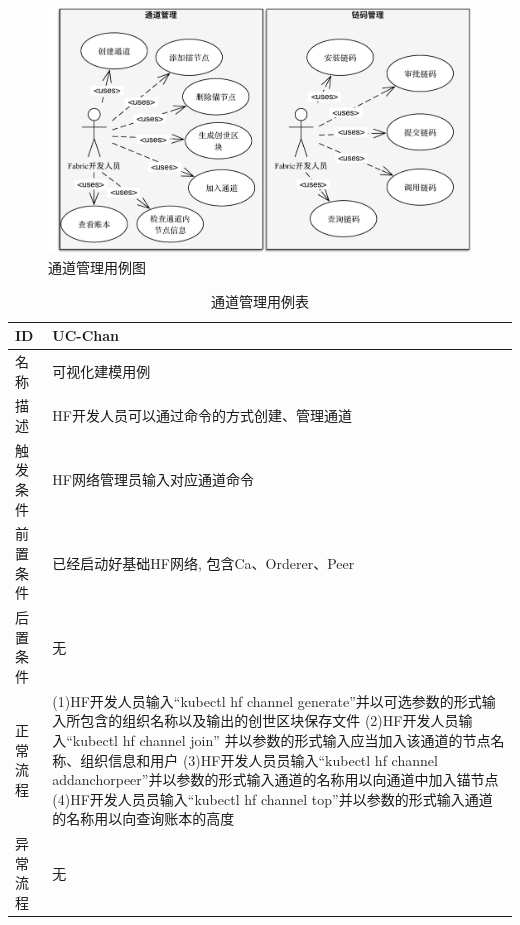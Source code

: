 \begin{figure}[!htbp] %
    \centering %
    \includegraphics[width=1.0\textwidth]{FIGs/chapter4/chan_cc_use_case.pdf} %
    \caption{通道管理用例图} %
    \label{chan_cc_use_case_pic} %
\end{figure}%

{\footnotesize
\begin{longtable}[h]{m{60pt}|m{280pt}}
    \caption[通道管理用例表]{通道管理用例表} \label{chan_use_case} \\
        \hline  
        ID&UC-Chan\\
        \hline
        名称&可视化建模用例\\
        \hline
        描述&HF开发人员可以通过命令的方式创建、管理通道\\
        \hline
        触发条件&HF网络管理员输入对应通道命令\\
        \hline
        前置条件&已经启动好基础HF网络, 包含Ca、Orderer、Peer\\
        \hline
        后置条件&无\\
        \hline
        正常流程& (1)HF开发人员输入“kubectl hf channel generate”并以可选参数的形式输入所包含的组织名称以及输出的创世区块保存文件
        \newline (2)HF开发人员输入“kubectl hf channel join” 并以参数的形式输入应当加入该通道的节点名称、组织信息和用户
        \newline (3)HF开发人员员输入“kubectl hf channel addanchorpeer”并以参数的形式输入通道的名称用以向通道中加入锚节点
        \newline (4)HF开发人员员输入“kubectl hf channel top”并以参数的形式输入通道的名称用以向查询账本的高度 \\
        \hline 
        异常流程& 无 \\
        \hline
    \end{longtable} 
}


